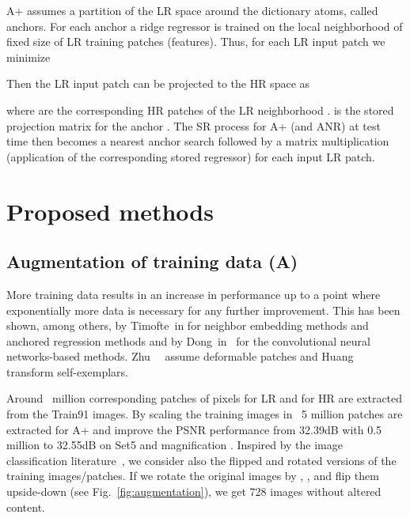 \documentclass[10pt,twocolumn,letterpaper]{article}
\begin{document}
A+ assumes a partition of the LR space around the dictionary atoms, called anchors.
For each anchor  a ridge regressor is trained on the local neighborhood  of fixed size of LR training patches (features). Thus, for each LR input patch  we minimize

Then the LR input patch  can be projected to the HR space as 

where  are the corresponding HR patches of the LR neighborhood .   is the stored projection matrix for the anchor .
The SR process for A+ (and ANR) at test time then becomes a nearest anchor search followed by a matrix multiplication (application of the corresponding stored regressor) for each input LR patch.

\section{Proposed methods}
\label{sec:methods}

\subsection{Augmentation of training data (A)}
\label{ssc:augmentation}
 More training data results in an increase in performance up to a point where exponentially more data is necessary for any further improvement. This has been shown, among others, by Timofte~\etal in \cite{Timofte-ICCV-2013,Timofte-ACCV-2014} for neighbor embedding methods and anchored regression methods and by Dong~\etal in~\cite{Dong-ECCV-2014, Dong-PAMI-2015} for the convolutional neural networks-based methods.
 Zhu~\etal~\cite{Zhu-CVPR-2014} assume deformable patches and Huang~\etal~\cite{Huang-CVPR-2015} transform self-exemplars.

Around ~million corresponding patches of  pixels for LR and  for HR are extracted from the Train91 images. By scaling the training images in~\cite{Timofte-ACCV-2014} 5 million patches are extracted for A+ and improve the PSNR performance from 32.39dB with 0.5 million to 32.55dB on Set5 and magnification .
Inspired by the image classification literature~\cite{Chatfield-BMVC-2014}, we consider also the flipped and rotated versions of the training images/patches.
If we rotate the original images by , ,  and flip them upside-down (see Fig.~\ref{fig:augmentation}), we get 728 images without altered content.
\end{document}
